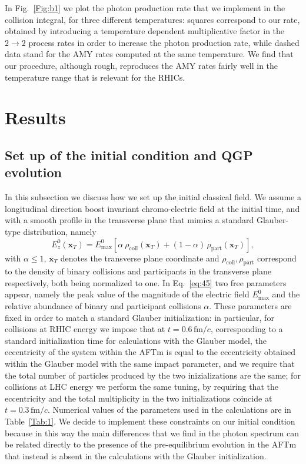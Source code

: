 \documentclass[aps,prc,a4paper,nofootinbib,
preprintnumbers,superscriptaddress,twocolumn,showpacs,showkeys]{revtex4}
\begin{document}
In Fig.~\ref{Fig:b1} we plot the photon production rate that we implement in the collision integral,
for three different temperatures: squares correspond to our rate, obtained by 
introducing a temperature dependent multiplicative factor in the $2\rightarrow2$ process rates 
in  order to increase the photon production rate,  while dashed data stand for the AMY rates
computed at the same temperature. We find that our procedure, although rough, reproduces the AMY rates fairly
well in the temperature range that is relevant for the RHICs.

 


\section{Results}

\subsection{Set up of the initial condition and QGP evolution}
In this subsection we discuss how we set up the initial classical field. 
We assume a longitudinal direction boost invariant  chromo-electric field at the initial time, 
and with a smooth profile in the transverse plane that mimics a standard Glauber-type distribution, namely
\begin{equation}
E_z^0(\bm x_T)=E^0_{\mathrm{max}}\left[\alpha~\rho_{\mathrm {coll}}(\bm x_T)
+(1-\alpha)\,\rho_{\mathrm{part}}(\bm x_T)\right],
\label{eq:45}
\end{equation}  
with $\alpha\leq1$, $\bm x_T$ denotes the transverse plane coordinate
and $\rho_{\mathrm {coll}},\rho_{\mathrm {part}}$ correspond to the
density of binary collisions and participants in the transverse plane respectively,
both being normalized to one.
In Eq.~\eqref{eq:45} two free parameters appear, namely the peak value of the magnitude
of the electric field $E^0_{\mathrm{max}}$  and the relative abundance of binary and participant
collisions $\alpha$.
These parameters are fixed in order to match a standard Glauber initialization: in particular,
for collisions at RHIC energy we impose that at $t= 0.6\,\mathrm{fm}/c$,
corresponding to a standard initialization time for calculations with the Glauber model,
the eccentricity of the system within the AFTm is equal to the eccentricity obtained within the Glauber model
with the same impact parameter, and we require that the total number of particles
produced by the two inizializations are the same; for collisions at LHC energy we 
perform the same tuning, by requiring that the eccentricity and the total multiplicity in the two initializations
coincide at $t= 0.3\,\mathrm{fm}/c$.
Numerical values of the parameters used in the calculations are in Table~\ref{Tab:1}.
We decide to implement these constraints on our initial condition because in this way
the main differences that we find in the photon spectrum  
can be related directly to the presence of the pre-equilibrium evolution
in the AFTm that instead is absent in the calculations with the Glauber initialization.
\end{document}
